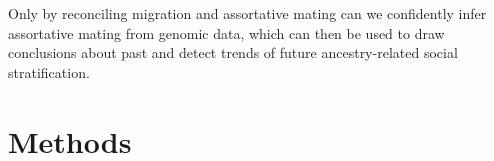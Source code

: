 \documentclass[11pt]{article}
\begin{document}
Only by reconciling migration and assortative mating can we confidently infer assortative mating from genomic data, which can then be used to draw conclusions about past and detect trends of future ancestry-related social stratification.










\vspace{8mm}
\section{Methods}



\end{document}
